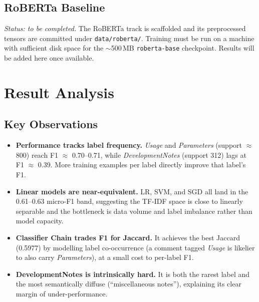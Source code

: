 \documentclass[11pt,a4paper]{article}
\begin{document}
\subsection{RoBERTa Baseline}

\textit{Status: to be completed.} The RoBERTa track is scaffolded and its
preprocessed tensors are committed under \texttt{data/roberta/}. Training must be
run on a machine with sufficient disk space for the $\sim$500\,MB
\texttt{roberta-base} checkpoint. Results will be added here once available.

\section{Result Analysis}
\label{sec:analysis}

\subsection{Key Observations}

\begin{itemize}
    \item \textbf{Performance tracks label frequency.} \textit{Usage} and
          \textit{Parameters} (support $\approx$ 800) reach F1 $\approx$
          0.70--0.71, while \textit{DevelopmentNotes} (support 312) lags at F1
          $\approx$ 0.39. More training examples per label directly improve that
          label's F1.

    \item \textbf{Linear models are near-equivalent.} LR, SVM, and SGD all land
          in the 0.61--0.63 micro-F1 band, suggesting the TF-IDF space is close
          to linearly separable and the bottleneck is data volume and label
          imbalance rather than model capacity.

    \item \textbf{Classifier Chain trades F1 for Jaccard.} It achieves the best
          Jaccard (0.5977) by modelling label co-occurrence (a comment tagged
          \textit{Usage} is likelier to also carry \textit{Parameters}), at a
          small cost to per-label F1.

    \item \textbf{DevelopmentNotes is intrinsically hard.} It is both the rarest
          label and the most semantically diffuse (``miscellaneous notes''),
          explaining its clear margin of under-performance.
\end{itemize}
\end{document}
